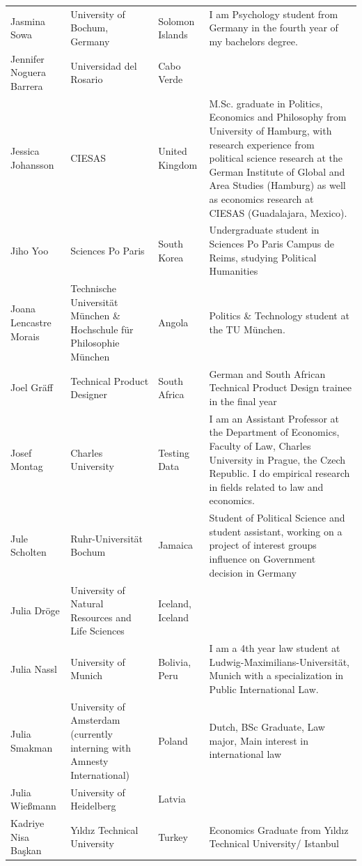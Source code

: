 \documentclass[]{article}
\begin{document}
\begin{longtable}{l>{\raggedright\arraybackslash}p{2cm}>{\raggedright\arraybackslash}p{2cm}>{\raggedright\arraybackslash}p{3cm}}
Jasmina Sowa & University of Bochum, Germany & Solomon Islands & I am Psychology student from Germany in the fourth year of my bachelors degree.\\
\rowcolor{gray!6}  Jennifer Noguera Barrera & Universidad del Rosario & Cabo Verde & \\
Jessica Johansson & CIESAS & United Kingdom & M.Sc. graduate in Politics, Economics and Philosophy from University of Hamburg, with research experience from political science research at the German Institute of Global and Area Studies (Hamburg) as well as economics research at CIESAS (Guadalajara, Mexico).\\
\rowcolor{gray!6}  Jiho Yoo & Sciences Po Paris & South Korea & Undergraduate student in Sciences Po Paris Campus de Reims, studying Political Humanities\\
\addlinespace
Joana Lencastre Morais & Technische Universität München \& Hochschule für Philosophie München & Angola & Politics \& Technology student at the TU München.\\
\rowcolor{gray!6}  Joel Gräff & Technical Product Designer & South Africa & German and South African Technical Product Design trainee in the final year\\
Josef Montag & Charles University & Testing Data & I am an Assistant Professor at the Department of Economics, Faculty of Law, Charles University in Prague, the Czech Republic. I do empirical research in fields related to law and economics.\\
\rowcolor{gray!6}  Jule Scholten & Ruhr-Universität Bochum & Jamaica & Student of Political Science and student assistant, working on a project of interest groups influence on Government decision in Germany\\
Julia Dröge & University of Natural Resources and Life Sciences & Iceland, Iceland & \\
\addlinespace
\rowcolor{gray!6}  Julia Nassl & University of Munich & Bolivia, Peru & I am a 4th year law student at Ludwig-Maximilians-Universität, Munich with a specialization in Public International Law.\\
Julia Smakman & University of Amsterdam (currently interning with Amnesty International) & Poland & Dutch, BSc Graduate, Law major, Main interest in international law\\
\rowcolor{gray!6}  Julia Wießmann & University of Heidelberg & Latvia & \\
Kadriye Nisa Başkan & Yıldız Technical University & Turkey & Economics Graduate from Yıldız Technical University/ Istanbul\\

\end{longtable}
\end{document}
